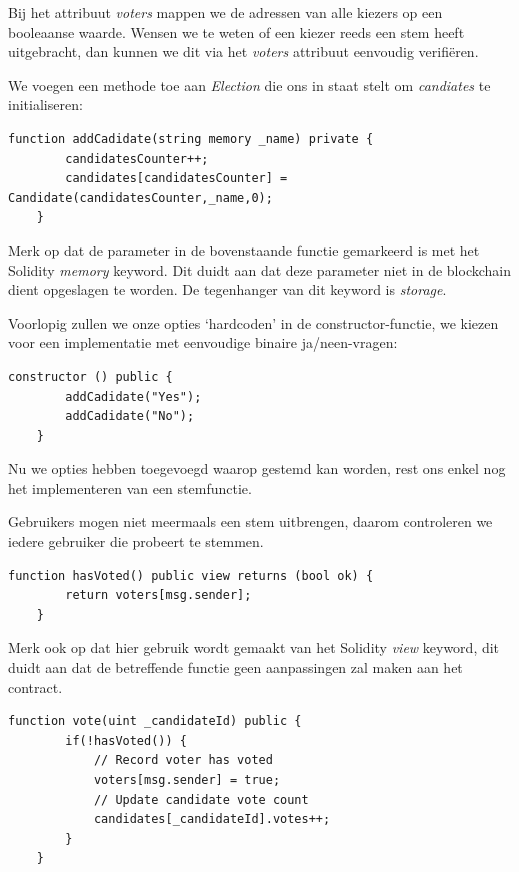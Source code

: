 	Bij het attribuut \textit{voters} mappen we de adressen van alle kiezers op een booleaanse waarde. Wensen we te weten of een kiezer reeds een stem heeft uitgebracht, dan kunnen we dit via het \textit{voters} attribuut eenvoudig verifiëren. 
	
	We voegen een methode toe aan \textit{Election} die ons in staat stelt om \textit{candiates} te initialiseren:
	
	\begin{lstlisting}[numbers=none]
	function addCadidate(string memory _name) private {
		candidatesCounter++;
		candidates[candidatesCounter] = Candidate(candidatesCounter,_name,0);
	}
	\end{lstlisting}
	Merk op dat de parameter in de bovenstaande functie gemarkeerd is met het Solidity \textit{memory} keyword. Dit duidt aan dat deze parameter niet in de blockchain dient opgeslagen te worden. De tegenhanger van dit keyword is \textit{storage}.
	
	Voorlopig zullen we onze opties `hardcoden' in de constructor-functie, we kiezen voor een implementatie met eenvoudige binaire ja/neen-vragen:
	
	\begin{lstlisting}[numbers=none]
	constructor () public {
		addCadidate("Yes");
		addCadidate("No");
	}
	\end{lstlisting}
	
	Nu we opties hebben toegevoegd waarop gestemd kan worden, rest ons enkel nog het implementeren van een stemfunctie. 
	
	Gebruikers mogen niet meermaals een stem uitbrengen, daarom controleren we iedere gebruiker die probeert te stemmen. 
	
	\begin{lstlisting}[numbers=none]
	function hasVoted() public view returns (bool ok) {
		return voters[msg.sender];
	}
	\end{lstlisting}
	
	Merk ook op dat hier gebruik wordt gemaakt van het Solidity \textit{view} keyword, dit duidt aan dat de betreffende functie geen aanpassingen zal maken aan het contract. 
	
	\begin{lstlisting}[numbers=none]
	function vote(uint _candidateId) public {
		if(!hasVoted()) {
			// Record voter has voted
			voters[msg.sender] = true;
			// Update candidate vote count
			candidates[_candidateId].votes++;
		}
	}
	\end{lstlisting}
	
